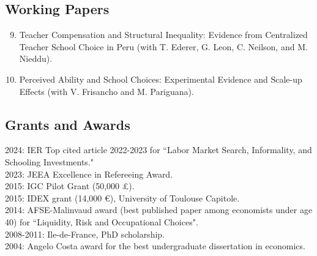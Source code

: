 \documentclass[12pt,english]{article}
\begin{document}
\subsection*{Working Papers}
\begin{enumerate}
\setcounter{enumi}{8}


\item Teacher Compensation and Structural Inequality: Evidence from Centralized Teacher School Choice in Peru (with T. Ederer, G. Leon, C. Neilson, and M. Nieddu).
\item Perceived Ability and School Choices: Experimental Evidence and Scale-up Effects (with V. Frisancho and M. Pariguana).  


\end{enumerate}

\subsection*{Grants and Awards}
2024: IER Top cited article 2022-2023 for ``Labor Market Search, Informality, and Schooling Investments."\vspace{0.2cm} \\
2023: JEEA Excellence in Refereeing Award.\vspace{0.2cm} \\
2015: IGC Pilot Grant (50,000 \pounds). \vspace{0.2cm} \\
2015: IDEX grant (14,000 \euro), University of Toulouse Capitole. \vspace{0.2cm} \\
2014: AFSE-Malinvaud award (best published paper among economists under age 40) for ``Liquidity, Risk and Occupational Choices". \vspace{0.2cm}\\
2008-2011: Ile-de-France, PhD scholarship. \vspace{0.2cm}\\
2004: Angelo Costa award for the best undergraduate dissertation in economics. 
\end{document}
